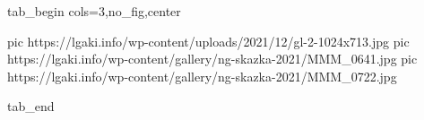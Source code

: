  
 
 
 
 


\ifcmt
  tab_begin cols=3,no_fig,center

     pic https://lgaki.info/wp-content/uploads/2021/12/gl-2-1024x713.jpg
		 pic https://lgaki.info/wp-content/gallery/ng-skazka-2021/MMM_0641.jpg
		 pic https://lgaki.info/wp-content/gallery/ng-skazka-2021/MMM_0722.jpg

  tab_end
\fi
